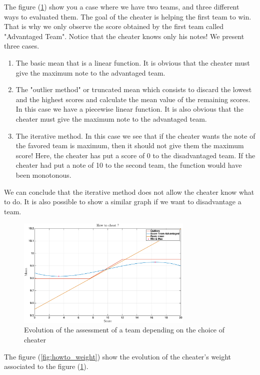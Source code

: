 \documentclass[12pt,a4paper]{article}
\begin{document}
The figure (\ref{fig:howto}) show you a case where we have two teams, and three different ways to evaluated them. The goal of the cheater is helping the first team to win. That is why we only observe the score obtained by the first team called "Advantaged Team". Notice that the cheater knows only his notes! We present three cases.
\begin{enumerate}
    \item The basic mean that is a linear function. It is obvious that the cheater must give the maximum note to the advantaged team.
    \item The "outlier method" or truncated mean which consists to discard the lowest and the highest scores and calculate the mean value of the remaining scores. In this case we have a piecewise linear function. It is also obvious that the cheater must give the maximum note to the advantaged team.
    \item The iterative method. In this case we see that if the cheater wants the note of the favored team is maximum, then it should not give them the maximum score! Here, the cheater has put a score of 0 to the disadvantaged team. If the cheater had put a note of 10 to the second team, the function would have been monotonous.
\end{enumerate}
We can conclude that the iterative method does not allow the cheater know what to do. It is also possible to show a similar graph if we want to disadvantage a team.

\begin{figure}[h!]
\centering
\includegraphics[width = 0.75\textwidth]{cheaters/howTo.eps}
\caption{Evolution of the assessment of a team depending on the choice of cheater}
\label{fig:howto}
\end{figure}

The figure (\ref{fig:howto_weight}) show the evolution of the cheater's weight associated to the figure (\ref{fig:howto}).
\end{document}
